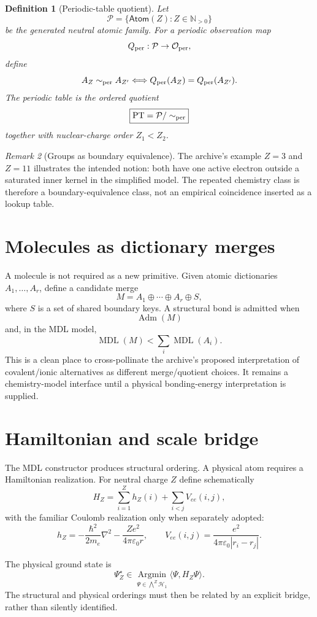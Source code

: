 \documentclass[11pt,a4paper]{article}
\newtheorem{definition}{Definition}[section]
\theoremstyle{remark}
\newtheorem{remark}[definition]{Remark}
\newcommand{\Hone}{\mathcal H_1}
\newcommand{\MDL}{\operatorname{MDL}}
\newcommand{\Argmin}{\operatorname*{Argmin}}
\newcommand{\PT}{\operatorname{PT}}
\newcommand{\Atom}{\mathsf{Atom}}
\newcommand{\Nat}{\mathbb N}
\newcommand{\simper}{\sim_{\rm per}}
\begin{document}
\begin{definition}[Periodic-table quotient]
Let
\[
 \mathcal P=\{\Atom(Z):Z\in\Nat_{>0}\}
\]
be the generated neutral atomic family.  For a periodic observation map
\[
 Q_{\rm per}:\mathcal P\to\mathcal O_{\rm per},
\]
define
\[
 A_Z\simper A_{Z'}
 \Longleftrightarrow
 Q_{\rm per}(A_Z)=Q_{\rm per}(A_{Z'}).
\]
The periodic table is the ordered quotient
\[
 \boxed{\PT=\mathcal P/\simper}
\]
together with nuclear-charge order $Z_1<Z_2$.
\end{definition}

\begin{remark}[Groups as boundary equivalence]
The archive's example $Z=3$ and $Z=11$ illustrates the intended notion: both
have one active electron outside a saturated inner kernel in the simplified
model.  The repeated chemistry class is therefore a boundary-equivalence class,
not an empirical coincidence inserted as a lookup table.
\end{remark}

\section{Molecules as dictionary merges}

A molecule is not required as a new primitive.  Given atomic dictionaries
$A_1,\dots,A_r$, define a candidate merge
\[
 M=A_1\oplus\cdots\oplus A_r\oplus S,
\]
where $S$ is a set of shared boundary keys.  A structural bond is admitted when
\[
 \operatorname{Adm}(M)
\]
and, in the MDL model,
\[
 \MDL(M)<\sum_i\MDL(A_i).
\]
This is a clean place to cross-pollinate the archive's proposed interpretation
of covalent/ionic alternatives as different merge/quotient choices.  It remains
a chemistry-model interface until a physical bonding-energy interpretation is
supplied.

\section{Hamiltonian and scale bridge}

The MDL constructor produces structural ordering.  A physical atom requires a
Hamiltonian realization.  For neutral charge $Z$ define schematically
\[
 H_Z=\sum_{i=1}^{Z}h_Z(i)+\sum_{i<j}V_{ee}(i,j),
\]
with the familiar Coulomb realization only when separately adopted:
\[
 h_Z=-\frac{\hbar^2}{2m_e}\nabla^2-
 \frac{Ze^2}{4\pi\varepsilon_0 r},
 \qquad
 V_{ee}(i,j)=\frac{e^2}{4\pi\varepsilon_0|r_i-r_j|}.
\]

The physical ground state is
\[
 \Psi_Z^\star\in
 \Argmin_{\Psi\in\bigwedge^Z\Hone}
 \langle\Psi,H_Z\Psi\rangle.
\]
The structural and physical orderings must then be related by an explicit
bridge, rather than silently identified.
\end{document}
